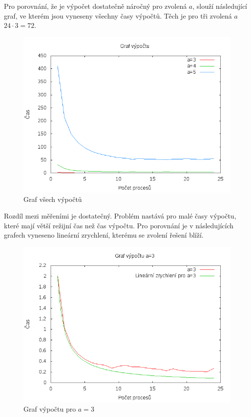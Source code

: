 \documentclass[a4paper,10pt]{report}
\begin{document}
Pro porovnání, že je výpočet dostatečně náročný pro zvolená $a$, slouží následující graf, ve kterém jsou vyneseny všechny časy výpočtů. Těch je pro tři zvolená $a$ $24 \cdot 3 = 72$.

\begin{figure}[H]
  \centering
    \includegraphics[width=1\textwidth]{../data/star_logs/graf_all.png}
  \caption{Graf všech výpočtů}
  \label{fig:con}
\end{figure}

Rozdíl mezi měřeními je dostatečný. Problém nastává pro malé časy výpočtu, které mají větší režijní čas než čas výpočtu. Pro porovnání je v následujících grafech vyneseno lineární zrychlení, kterému se zvolení řešení blíží.

\begin{figure}[H]
  \centering
    \includegraphics[width=1\textwidth]{../data/star_logs/graf3.png}
  \caption{Graf výpočtu pro $a=3$}
  \label{fig:tre}
\end{figure}
\end{document}

